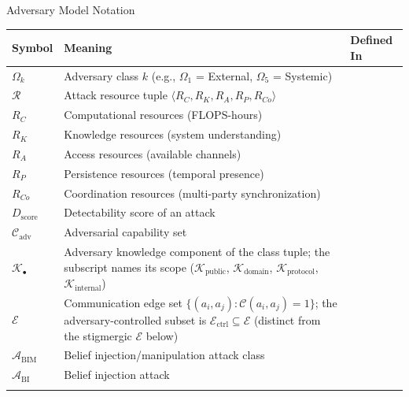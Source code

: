 \documentclass[
  ignorenonframetext,
]{beamer}
\newcounter{none} %
\providecommand{\cref}[1]{\texttt{\detokenize{#1}}}
\begin{document}
\begin{frame}[allowframebreaks]{Adversary Model Notation}
{\def\LTcaptype{none} %
\begin{longtable}[]{@{}
  >{\raggedright\arraybackslash}p{}
  >{\raggedright\arraybackslash}p{}
  >{\raggedright\arraybackslash}p{}@{}}
\toprule\noalign{}
\begin{minipage}[b]{\linewidth}\raggedright
Symbol
\end{minipage} & \begin{minipage}[b]{\linewidth}\raggedright
Meaning
\end{minipage} & \begin{minipage}[b]{\linewidth}\raggedright
Defined In
\end{minipage} \\
\midrule\noalign{}
\endhead
\(\Omega_k\) & Adversary class \(k\) (e.g., \(\Omega_1\) = External,
\(\Omega_5\) = Systemic) & \cref{def:adversary-class} \\
\(\mathcal{R}\) & Attack resource tuple
\(\langle R_C, R_K, R_A, R_P, R_{Co} \rangle\) & \cref{def:resources} \\
\(R_C\) & Computational resources (FLOPS-hours) &
\cref{tab:resource-types} \\
\(R_K\) & Knowledge resources (system understanding) &
\cref{tab:resource-types} \\
\(R_A\) & Access resources (available channels) &
\cref{tab:resource-types} \\
\(R_P\) & Persistence resources (temporal presence) &
\cref{tab:resource-types} \\
\(R_{Co}\) & Coordination resources (multi-party synchronization) &
\cref{tab:resource-types} \\
\(D_{\text{score}}\) & Detectability score of an attack &
\cref{def:detectability} \\
\(\mathcal{C}_{\text{adv}}\) & Adversarial capability set &
\cref{def:capability-set} \\
\(\mathcal{K}_\bullet\) & Adversary knowledge component of the class
tuple; the subscript names its scope (\(\mathcal{K}_{\text{public}}\),
\(\mathcal{K}_{\text{domain}}\), \(\mathcal{K}_{\text{protocol}}\),
\(\mathcal{K}_{\text{internal}}\)) & \cref{sec:threat-model} \\
\(\mathcal{E}\) & Communication edge set
\(\{(a_i, a_j) : \mathcal{C}(a_i, a_j) = 1\}\); the adversary-controlled
subset is \(\mathcal{E}_{\text{ctrl}} \subseteq \mathcal{E}\) (distinct
from the stigmergic \(\mathcal{E}\) below) & \cref{def:omega4} \\
\(\mathcal{A}_{\text{BIM}}\) & Belief injection/manipulation attack
class & \cref{sec:attack-taxonomy} \\
\(\mathcal{A}_{\text{BI}}\) & Belief injection attack &
\cref{thm:belief-injection} \\
\bottomrule\noalign{}
\end{longtable}
}
\end{frame}
\end{document}
